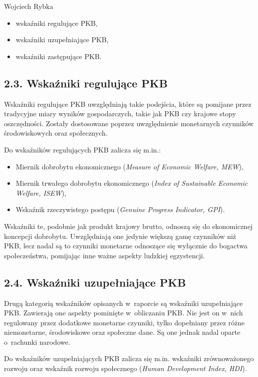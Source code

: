 \begin{artplenv}{Wojciech Rybka}
\begin{itemize}
\item wskaźniki regulujące PKB,
\item wskaźniki uzupełniające PKB,
\item wskaźniki zastępujące PKB. 
\end{itemize}

\subsection{2.3. Wskaźniki regulujące PKB}

Wskaźniki regulujące PKB uwzględniają takie podejścia, które są pomijane przez tradycyjne miary wyników gospodarczych, takie jak PKB
czy krajowe stopy oszczędności. Zostały dostosowane poprzez uwzględnienie monetarnych czynników środowiskowych
oraz społecznych.

Do wskaźników regulujących PKB zalicza się m.in.:

\begin{itemize}
\item Miernik dobrobytu ekonomicznego (\textit{Measure of Economic Welfare, MEW}),
\item Miernik trwałego dobrobytu ekonomicznego (\textit{Index of Sustainable Economic Welfare, ISEW}),
\item Wskaźnik rzeczywistego postępu (\textit{Genuine Progress Indicator, GPI}).
\end{itemize}

Wskaźniki te, podobnie jak produkt krajowy brutto, odnoszą się do ekonomicznej koncepcji dobrobytu. Uwzględniają one
jedynie większą gamę czynników niż PKB, lecz nadal są to czynniki monetarne odnoszące się wyłącznie do bogactwa
społeczeństwa, pomijając inne ważne aspekty ludzkiej egzystencji.

\subsection{2.4. Wskaźniki uzupełniające PKB}
Drugą kategorią wskaźników opisanych w~raporcie są wskaźniki uzupełniające PKB. Zawierają one aspekty
pominięte w~obliczaniu PKB. Nie jest on w~nich regulowany przez dodatkowe monetarne czynniki, tylko dopełniany przez różne
niemonetarne, środowiskowe oraz społeczne dane. Są one jednak nadal oparte o~rachunki narodowe.

Do wskaźników uzupełniających PKB zalicza się m.in. wskaźniki zrównoważonego rozwoju oraz wskaźnik rozwoju społecznego
(\textit{Human Development Index, HDI}).


\end{artplenv}
